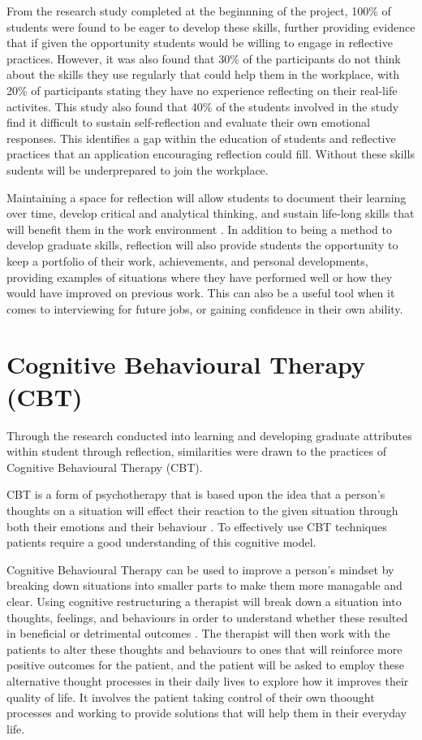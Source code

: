 \documentclass{l4proj}
\begin{document}
From the research study completed at the beginnning of the project, 100\% of students were found to be eager to develop these skills, further providing evidence that if given the opportunity students would be willing to engage in reflective practices. However, it was also found that 30\% of the participants do not think about the skills they use regularly that could help them in the workplace, with 20\% of participants stating they have no experience reflecting on their real-life activites. This study also found that 40\% of the students involved in the study find it difficult to sustain self-reflection and evaluate their own emotional responses. This identifies a gap within the education of students and reflective practices that an application encouraging reflection could fill. Without these skills sudents will be underprepared to join the workplace.

Maintaining a space for reflection will allow students to document their learning over time, develop critical and analytical thinking, and sustain life-long skills that will benefit them in the work environment \citep{mcdermott_developing_nodate}.  In addition to being a method to develop graduate skills, reflection will also provide students the opportunity to keep a portfolio of their work, achievements, and personal developments, providing examples of situations where they have performed well or how they would have improved on previous work. This can also be a useful tool when it comes to interviewing for future jobs, or gaining confidence in their own ability. 


\section{Cognitive Behavioural Therapy (CBT)}

Through the research conducted into learning and developing graduate attributes within student through reflection, similarities were drawn to the practices of Cognitive Behavioural Therapy (CBT). 

CBT is a form of psychotherapy that is based upon the idea that a person's thoughts on a situation will effect their reaction to the given situation through both their emotions and their behaviour \citep{whatisCBT_therapistAid}. To effectively use CBT techniques patients require a good understanding of this cognitive model. 

Cognitive Behavioural Therapy can be used to improve a person's mindset by breaking down situations into smaller parts to make them more managable and clear. Using cognitive restructuring a therapist will break down a situation into thoughts, feelings, and behaviours in order to understand whether these resulted in beneficial or detrimental outcomes \citep{nhs_cognitive_2017}. The therapist will then work with the patients to alter these thoughts and behaviours to ones that will reinforce more positive outcomes for the patient, and the patient will be asked to employ these alternative thought processes in their daily lives to explore how it improves their quality of life. It involves the patient taking control of their own thoought processes and working to provide solutions that will help them in their everyday life.
\end{document}

